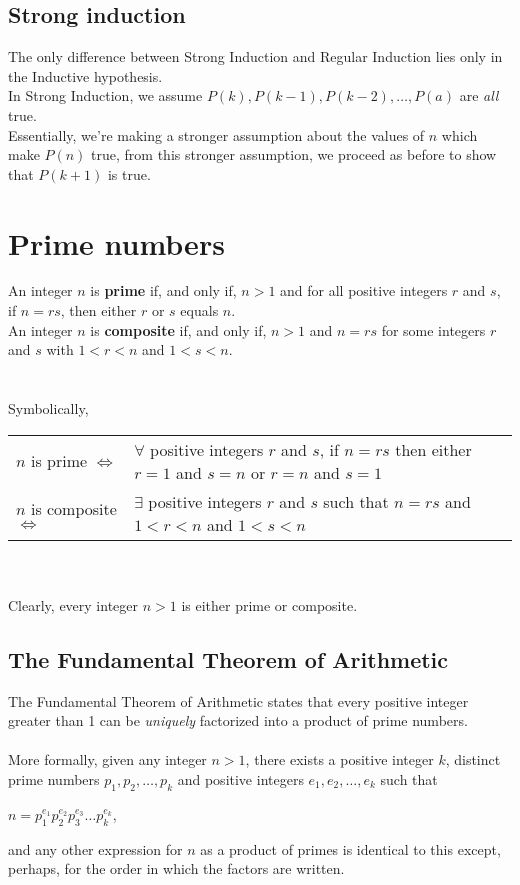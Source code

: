 \documentclass[a4paper]{article}
\begin{document}
\subsection{Strong induction}
The only difference between Strong Induction and Regular Induction lies only in the Inductive hypothesis.\\
In Strong Induction, we assume $P(k), P(k-1), P(k-2),\dots,P(a)$ are \textit{all} true.\\
Essentially, we're making a stronger assumption about the values of $n$ which make $P(n)$ true, from this stronger assumption, we proceed as before to show that $P(k+1)$ is true.

\section{Prime numbers}
An integer $n$ is \textbf{prime} if, and only if, $n>1$ and for all positive integers $r$ and $s$, if $n=rs$, then either $r$ or $s$ equals $n$.\\
An integer $n$ is \textbf{composite} if, and only if, $n>1$ and $n=rs$ for some integers $r$ and $s$ with $1<r<n$ and $1<s<n$.\\ \\ \\
Symbolically,\\
\begin{tabular}%
{>{\raggedleft\arraybackslash}p{3.5cm}%
	>{\raggedright\arraybackslash}p{10cm}%
}
$n$ is prime $\iff$ & $\forall$ positive integers $r$ and $s$, if $n=rs$ then either $r=1$ and $s=n$ or $r=n$ and $s=1$\\
$n$ is composite$\iff$ & $\exists$ positive integers $r$ and $s$ such that $n=rs$ and $1<r<n$ and $1<s<n$
\end{tabular}\\ \\
Clearly, every integer $n>1$ is either prime or composite.

\subsection{The Fundamental Theorem of Arithmetic}
The Fundamental Theorem of Arithmetic states that every positive integer greater than 1 can be \textit{uniquely} factorized into a product of prime numbers.\\ \\
More formally, given any integer $n>1$, there exists a positive integer $k$, distinct prime numbers $p_1,p_2,\dots,p_k$ and positive integers $e_1,e_2,\dots,e_k$ such that
\begin{center} $n=p^{e_1}_{1}p^{e_2}_{2}p^{e_3}_{3}\dots p^{e_k}_{k}$,
\end{center}
and any other expression for $n$ as a product of primes is identical to this except, perhaps, for the order in which the factors are written.
\end{document}
